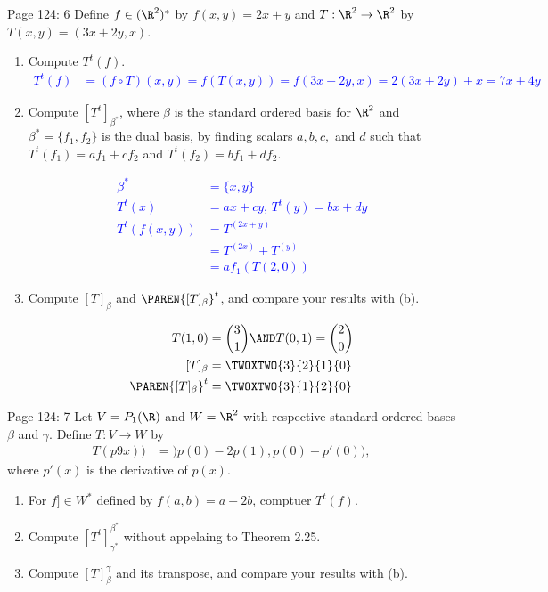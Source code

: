 \documentclass[10pt,a4paper]{report}
\newcommand{\BLUE}[1]{\textcolor{blue}{#1}}
\begin{document}
\noindent Page 124: 6 Define $f \in (\R^2)^*$ by $f(x,y)=2x+y$ and $T: \R^2\to \R^2$ by $T(x,y) = (3x+2y,x)$.
\begin{enumerate}[label=(\alph*)]
\item Compute $T^t(f)$.
\BLUE{\begin{align*}
	T^t(f) &= (f\circ T)(x,y) =f(T(x,y))=f(3x+2y,x) = 2(3x+2y)+x = 7x+4y
\end{align*}
}

\item Compute $[T^t]_{\beta^*}$, where $\beta$ is the standard ordered basis for $\R^2$ and $\beta^*=\{f_1,f_2\}$ is the dual basis, by finding scalars $a,b,c,$ and $d$ such that $T^t(f_1)=af_1+cf_2$ and $T^t(f_2)=bf_1+df_2$.

\BLUE{\begin{align*}
	\beta^* &= \{ x, y\}\\
	T^t(x) &= ax+cy, \, T^t(y) = bx+dy \\
	T^t(f(x,y)) &= T^(2x+y) \\
		&= T^(2x)+T^(y) \\
		&= af_1(T(2,0))
\end{align*}
}

\item Compute $[T]_\beta$ and $\PAREN{[T]_\beta}^t$, and compare your results with (b).

\BLUE{\begin{align*}
	T(1,0) &= \binom{3}{1} \AND T(0,1) = \binom{2}{0}\\
	[T]_\beta &= \TWOXTWO{3}{2}{1}{0} \\
	\PAREN{[T]_\beta}^t &= \TWOXTWO{3}{1}{2}{0}
\end{align*}
}
\end{enumerate} 

\noindent Page 124: 7 Let $V=P_1(\R)$ and $W=\R^2$ with respective standard ordered bases $\beta$ and $\gamma$.  Define $T:V\to W$ by
\begin{align*}
	T(p9x))&= )p(0)-2p(1),p(0)+p'(0)),
\end{align*}where $p'(x)$ is the derivative of $p(x)$.
\begin{enumerate}
	\item For $f ]\in W^*$ defined by $f(a,b)=a-2b$, comptuer $T^t(f)$.
	\item Compute $[T^t]_{\gamma^*}^{\beta^*}$ without appelaing to Theorem 2.25.
	\item Compute $[T]_\beta^\gamma$ and its transpose, and compare your results with (b).
	
\end{enumerate}
\end{document}
